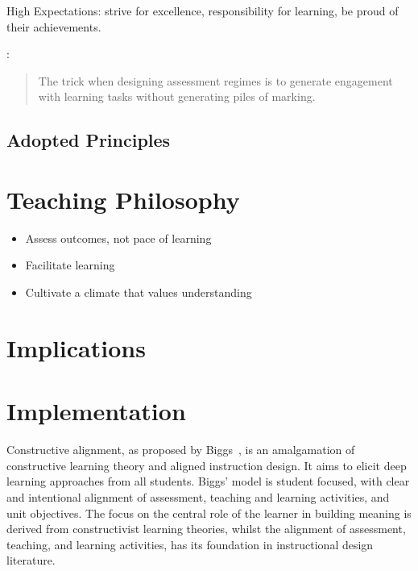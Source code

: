 High Expectations: strive for excellence, responsibility for learning, be proud of their achievements.

\citet{Chickering:1987}:

\citet{Gibbs:2004} 

\begin{quote}
	The trick when designing assessment regimes is to generate engagement with learning tasks without generating piles of marking.
\end{quote}



\subsection{Adopted Principles} %
\label{sub:adopted_principles}






\section{Teaching Philosophy} %
\label{sec:teaching_philosophy}

\begin{itemize}
	\item Assess outcomes, not pace of learning
	\item Facilitate learning 
	\item Cultivate a climate that values understanding
\end{itemize}




\section{Implications} %
\label{sec:implications}


\section{Implementation} %
\label{sec:design}

Constructive alignment, as proposed by Biggs~\cite{Biggs:1996c}, is an amalgamation of constructive learning theory and aligned instruction design. It aims to elicit deep learning approaches from all students. Biggs' model is student focused, with clear and intentional alignment of assessment, teaching and learning activities, and unit objectives. The focus on the central role of the learner in building meaning is derived from constructivist learning theories, whilst the alignment of assessment, teaching, and learning activities, has its foundation in instructional design literature. 

